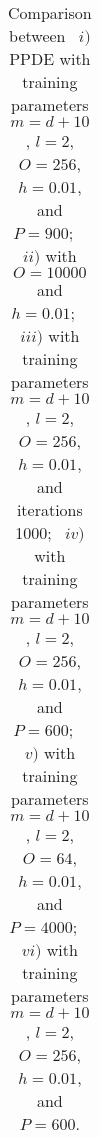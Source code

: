 \documentclass[12pt]{article}
\numberwithin{equation}{section}
\let\oldcitet=\citet
\renewcommand{\cite}[1]{\textcolor[rgb]{0,0,1}{\oldcitet{#1}}}
\renewcommand{\citet}[1]{\textcolor[rgb]{0,0,1}{\oldcitet{#1}}}
\begin{document}
\begin{table}[H]
{\begin{tabular}{|c|c|c|c|c|c|c|c|}
            \hline
		\end{tabular}}
		\caption{
            Comparison between
            \ $i)$ PPDE with training parameters
                $m = d+10$, $l  = 2$, $O = 256$, $h = 0.01$,
                and $P = 900$;
            \ $ii)$ \cite{ren2017convergence} with
                $O = 10000$ and $h = 0.01$;
            \ $iii)$ \cite{saporito2020pdgm} with training parameters
                $m = d+10$, $l  = 2$, $O = 256$, $h = 0.01$,
                and iterations 1000;
            \ $iv)$ \cite{sabate2020solving} with training parameters
                $m = d+10$, $l  = 2$, $O = 256$, $h = 0.01$,
                and $P = 600$;
            \ $v)$ \cite{han2018solving} with training parameters
                $m = d+10$, $l  = 2$, $O = 64$, $h = 0.01$,
                and $P = 4000$;
            \ $vi)$ \cite{beck2019deep} with training parameters
                $m = d+10$, $l  = 2$, $O = 256$, $h = 0.01$,
                and $P = 600$.}
        \label{table:asian_highdimension}
\end{table}
\end{document}
